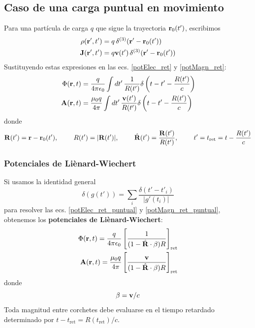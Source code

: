 \documentclass[]{article}
\numberwithin{equation}{section}
\begin{document}
\subsection{Caso de una carga puntual en movimiento}
Para una partícula de carga \(q\) que sigue la trayectoria \(\mathbf{r}_{0}(t')\), escribimos
\begin{align}
	\rho( \mathbf{r}', t') &= q\, \delta^{(3)}(\mathbf{r}' - \mathbf{r}_{0}(t'))\\
	\mathbf{J}(\mathbf{r}', t') &= q \mathbf{v}(t')\, \delta^{(3)}(\mathbf{r}' - \mathbf{r}_{0}(t'))
\end{align}
Sustituyendo estas expresiones en las ecs. \ref{potElec_ret} y \ref{potMagn_ret}:
\begin{align}
	\Phi( \rv, t) &= \ke[q] \int dt'\, \frac{1}{R(t')} \delta\left(t - t' - \frac{R(t')}{c} \right) \label{potElec_ret_puntual}\\
	\n{A}(\rv, t) &= \ku[q] \int dt'\, \frac{\n{v}(t')}{R(t')} \delta\left(t - t' - \frac{R(t')}{c} \right) \label{potMagn_ret_puntual}
\end{align}
donde
\begin{equation*}
	\mathbf{R}(t') = \mathbf{r}-\mathbf{r}_{0}(t'), ~~~~~~~ R(t') = |\mathbf{R}(t')|, ~~~~~~~ \hat{\mathbf{R}}(t') = \frac{\mathbf{R}(t')}{R(t')}, ~~~~~~~ t' = t_{\mathrm{ret}} = t - \frac{R(t')}{c}
\end{equation*}

\subsubsection{Potenciales de Liènard-Wiechert}
Si usamos la identidad general
\begin{equation}
	\delta\left(g(t')\right) = \sum_{i} \frac{\delta\left(t' - t'_{i}\right)}{|g'(t_{i})|}
\end{equation}
para resolver las ecs. \ref{potElec_ret_puntual} y \ref{potMagn_ret_puntual}, obtenemos los \textbf{potenciales de Liènard-Wiechert}:
\begin{align}
	\Phi(\rv,t)  = \ke[q] &\left[\frac{1}{(1 - \Rhat\cdot\n{\beta})R}\right]_{\mathrm{ret}} \label{potElec_L-W}\\
	\n{A}(\rv,t) = \ku[q] &\left[\frac{\n{v}}{(1 - \Rhat\cdot\n{\beta})R}\right]_{\mathrm{ret}} \label{potMagn_L-W}
\end{align}
donde
\begin{equation}
	\mathbf{\beta} = \mathbf{v}/c
\end{equation}
Toda magnitud entre corchetes debe evaluarse en el tiempo retardado determinado por \(t - t_{\mathrm{ret}} = R(t_{\mathrm{ret}})/c\).
\end{document}
